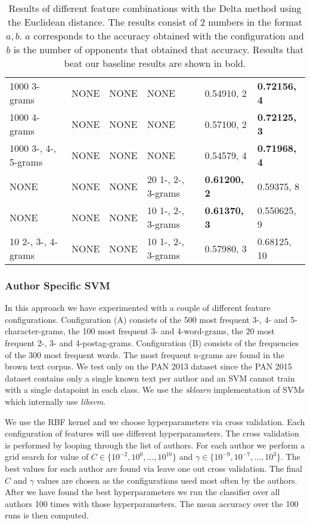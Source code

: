 \begin{landscape}
\begin{table}
\begin{tabular}{llll|ll}
        1000 3-grams & NONE & NONE & NONE & 0.54910, 2 & \textbf{0.72156, 4} \\
        1000 4-grams & NONE & NONE & NONE & 0.57100, 2 & \textbf{0.72125, 3} \\
        1000 3-, 4-, 5-grams & NONE & NONE & NONE & 0.54579, 4 &
        \textbf{0.71968, 4} \\
        NONE & NONE & NONE & 20 1-, 2-, 3-grams & \textbf{0.61200, 2} &
        0.59375, 8 \\
        NONE & NONE & NONE & 10 1-, 2-, 3-grams & \textbf{0.61370, 3} &
        0.550625, 9 \\
        10 2-, 3-, 4-grams & NONE & NONE & 10 1-, 2-, 3-grams & 0.57980, 3 &
        0.68125, 10
    \end{tabular}
    \caption{Results of different feature combinations with the Delta method
    using the Euclidean distance.  The results consist of 2 numbers in the format
    $a, b$. $a$ corresponds to the accuracy obtained with the configuration and
    $b$ is the number of opponents that obtained that accuracy. Results that
    beat our baseline results are shown in bold.}
    \label{fig:extended_delta_method_euclidean_result}
\end{table}
\end{landscape}

\subsubsection{Author Specific SVM} \label{subsubsec:method:author_specific_svm}
In this approach we have experimented with a couple of different feature
configurations. Configuration (A) consists of the 500 most frequent 3-, 4-
and 5-character-grams, the 100 most frequent 3- and 4-word-grams, the 20
most frequent 2-, 3- and 4-postag-grams. Configuration (B) consists of the
frequencies of the 300 most frequent words. The most frequent n-grams are found
in the brown text corpus. We test only on the PAN 2013 dataset since the PAN
2015 dataset contains only a single known text per author and an SVM cannot
train with a single datapoint in each class. We use the \textit{sklearn}
implementation of \gls{SVM}s which internally use \textit{libsvm}.

We use the RBF kernel and we choose hyperparameters via cross validation.
Each configuration of features will use different hyperparameters. The cross
validation is performed by looping through the list of authors. For each
author we perform a grid search for value of $C \in \{10^{-2}, 10^{0}, \dots,
10^{10}\}$ and $\gamma \in \{10^{-9}, 10^{-7}, \dots, 10^{3}\}$. The best values
for each author are found via leave one out cross validation. The final $C$ and
$\gamma$ values are chosen as the configurations used most often by the authors.
After we have found the best hyperparameters we run the classifier over all
authors 100 times with those hyperparameters. The mean accuracy over the 100
runs is then computed.


